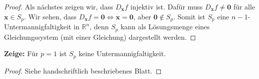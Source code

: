 \documentclass[a4paper]{article}
\renewcommand{\hline}{\noindent\makebox[\linewidth]{\rule{12cm}{1pt}}}
\begin{document}
\begin{proof}
\hline

Als nächstes zeigen wir, dass $D_\mathbf{x}f$ injektiv ist. Dafür muss $D_\mathbf{x}f \neq \mathbf 0$ für alle $\mathbf x \in S_p$. Wir sehen, dass $D_\mathbf{x} f = \mathbf 0 \iff \mathbf x = \mathbf 0$, aber $\mathbf 0 \notin S_p$. Somit ist $S_p$ eine $n-1$-Untermannigfaltigkeit in $\mathbb R^n$, denn $S_p$ kann als Lösungsmenge eines Gleichungssystem (mit einer Gleichung) dargestellt werden.
\end{proof}

\hline

\textbf{Zeige:} Für $p = 1$ ist $S_p$ keine Untermannigfaltigkeit.

\begin{proof}
Siehe handschriftlich beschriebenes Blatt.
\end{proof}
\end{document}
